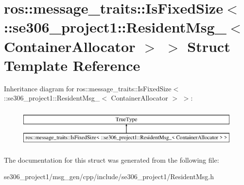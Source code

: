 \hypertarget{structros_1_1message__traits_1_1IsFixedSize_3_01_1_1se306__project1_1_1ResidentMsg___3_01ContainerAllocator_01_4_01_4}{\section{ros\-:\-:message\-\_\-traits\-:\-:Is\-Fixed\-Size$<$ \-:\-:se306\-\_\-project1\-:\-:Resident\-Msg\-\_\-$<$ Container\-Allocator $>$ $>$ Struct Template Reference}
\label{structros_1_1message__traits_1_1IsFixedSize_3_01_1_1se306__project1_1_1ResidentMsg___3_01ContainerAllocator_01_4_01_4}
}
Inheritance diagram for ros\-:\-:message\-\_\-traits\-:\-:Is\-Fixed\-Size$<$ \-:\-:se306\-\_\-project1\-:\-:Resident\-Msg\-\_\-$<$ Container\-Allocator $>$ $>$\-:\begin{figure}[H]
\begin{center}
\leavevmode
\includegraphics[height=2.000000cm]{structros_1_1message__traits_1_1IsFixedSize_3_01_1_1se306__project1_1_1ResidentMsg___3_01ContainerAllocator_01_4_01_4}
\end{center}
\end{figure}


The documentation for this struct was generated from the following file\-:\begin{DoxyCompactItemize}
\item 
se306\-\_\-project1/msg\-\_\-gen/cpp/include/se306\-\_\-project1/Resident\-Msg.\-h\end{DoxyCompactItemize}
